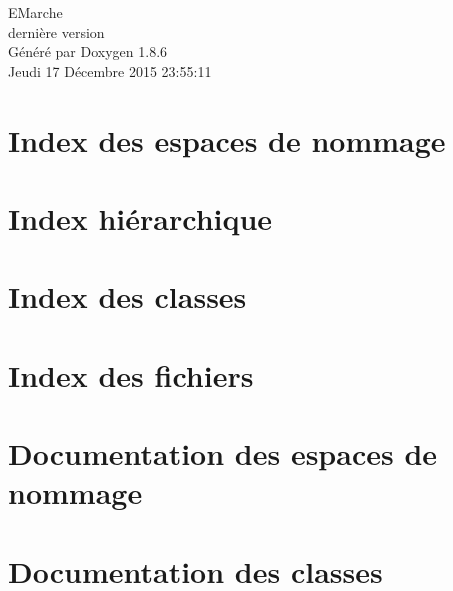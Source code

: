 \documentclass[twoside]{book}
\newcommand{\clearemptydoublepage}{%
  \newpage{\pagestyle{empty}\cleardoublepage}%
}
\begin{document}
\hypersetup{pageanchor=false}
\begin{titlepage}
\vspace*{7cm}
\begin{center}%
{\Large E\-Marche \\[1ex]\large dernière version }\\
\vspace*{1cm}
{\large Généré par Doxygen 1.8.6}\\
\vspace*{0.5cm}
{\small Jeudi 17 Décembre 2015 23:55:11}\\
\end{center}
\end{titlepage}
\clearemptydoublepage
\tableofcontents
\clearemptydoublepage
{}
\hypersetup{pageanchor=true}

\chapter{Index des espaces de nommage}

\chapter{Index hiérarchique}

\chapter{Index des classes}

\chapter{Index des fichiers}

\chapter{Documentation des espaces de nommage}

\chapter{Documentation des classes}




















\end{document}
